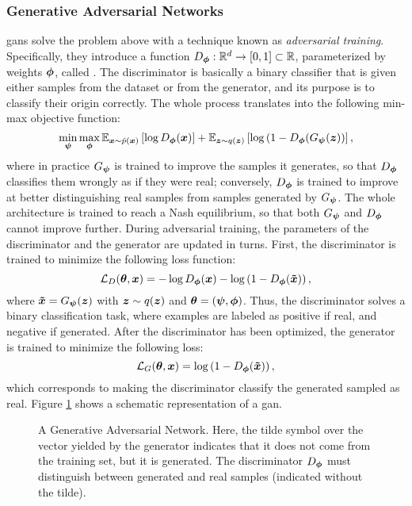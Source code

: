 \subsubsection*{Generative Adversarial Networks}
\glspl{gan} \citep{goodfellow2014gan} solve the problem above with a technique known as \emph{adversarial training}. Specifically, they introduce a function $D_{\boldsymbol{\phi}}: \mathbb{R}^d \rightarrow [0,1] \subset \mathbb{R}$, parameterized by weights $\boldsymbol{\phi}$, called . The discriminator is basically a binary classifier that is given either samples from the dataset or from the generator, and its purpose is to classify their origin correctly. The whole process translates into the following min-max objective function:
$$\min_{\GenParam} \max_{\DiscParam} \Expectation{\Vector{x} \sim \hat{p}(\Vector{x})}{\log \Discriminator(\Vector{x})} + \Expectation{\Vector{z} \sim q(\Vector{z})}{\log\Par{1-\Discriminator(\Generator(\Vector{z})}},$$
where in practice $G_{\boldsymbol{\psi}}$ is trained to improve the samples it generates, so that $D_{\boldsymbol{\phi}}$ classifies them wrongly as if they were real; conversely, $D_{\boldsymbol{\phi}}$ is trained to improve at better distinguishing real samples from samples generated by $G_{\boldsymbol{\psi}}$. The whole architecture is trained to reach a Nash equilibrium, so that both $G_{\boldsymbol{\psi}}$ and $D_{\boldsymbol{\phi}}$ cannot improve further. During adversarial training, the parameters of the discriminator and the generator are updated in turns. First, the discriminator is trained to minimize the following loss function:
$$\Loss_D(\Param, \Vector{x}) =  -\log \Discriminator(\Vector{x}) -\log\Par{1-\Discriminator(\Vector{\tilde{x}})},$$
where $\Vector{\tilde{x}} = \Generator(\Vector{z})$ with $\Vector{z} \sim q(\Vector{z})$ and $\boldsymbol{\theta} = (\boldsymbol{\psi}, \boldsymbol{\phi})$. Thus, the discriminator solves a binary classification task, where examples are labeled as positive if real, and negative if generated. After the discriminator has been optimized, the generator is trained to minimize the following loss:
$$\Loss_G(\Param, \Vector{x}) = \log\Par{1-\Discriminator(\Vector{\tilde{x}})},$$
which corresponds to making the discriminator classify the generated sampled as real. Figure \ref{fig:gan} shows a schematic representation of a \gls{gan}.
\begin{figure*}[h!]
    \centering
    \resizebox{.65\textwidth}{!}{}
    \caption{A Generative Adversarial Network. Here, the tilde symbol over the vector yielded by the generator indicates that it does not come from the training set, but it is generated. The discriminator $D_{\boldsymbol{\phi}}$ must distinguish between generated and real samples (indicated without the tilde).}
    \label{fig:gan}
\end{figure*}
